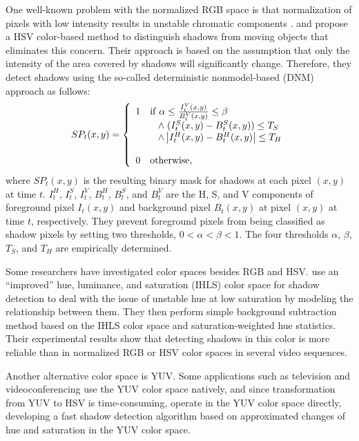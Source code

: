 One well-known problem with the normalized RGB space is that normalization of
pixels with low intensity results in unstable chromatic components
.  and
 propose a HSV color-based method to distinguish
shadows from moving objects that eliminates this concern. Their approach is
based on the assumption that only the intensity of the area covered by shadows
will significantly change. Therefore, they detect shadows using the so-called
deterministic nonmodel-based (DNM) approach as follows:
\[
  SP_t (x,y) = \left\{ 
  \begin{array}{ll}
    1 & {\rm if} \; \alpha \le \frac{{I_t^V (x,y)}}{{B_t^V (x,y)}} \le \beta\\ 
    & \;\;\; \wedge \; (I_t^S (x,y) - B_t^S (x,y)) \le T_S  \\ 
    & \;\;\; \wedge \left| {I_t^H (x,y) - B_t^H (x,y)} \right| \le T_H\\ \\
    0 & {\rm otherwise}, \\ 
  \end{array} \right.
\]
where $SP_t(x,y)$ is the resulting binary mask for shadows at each
pixel $(x,y)$ at time $t$.  $I_t^H$, $I_t^S$, $I_t^V$, $B_t^H$,
$B_t^S$, and $B_t^V$ are the H, S, and V components of foreground
pixel $I_t(x,y)$ and background pixel $B_t(x, y)$ at pixel $(x,y)$ at
time $t$, respectively.  They prevent foreground pixels from being
classified as shadow pixels by setting two thresholds, $0 < \alpha <
\beta < 1$.  The four thresholds $\alpha$, $\beta$, $T_S$, and $T_H$
are empirically determined.

Some researchers have investigated color spaces besides RGB and
HSV.  use an ``improved'' hue, luminance, and
saturation (IHLS) color space for shadow detection to deal with the
issue of unstable hue at low saturation by modeling the relationship
between them. They then perform simple background subtraction method
based on the IHLS color space and saturation-weighted hue statistics.
Their experimental results show that detecting shadows in this color
is more reliable than in normalized RGB or HSV color spaces in several
video sequences.

Another alternative color space is YUV.  Some applications such as
television and videoconferencing use the YUV color space natively, and
since transformation from YUV to HSV is
time-consuming,  operate in the YUV color
space directly, developing a fast shadow detection algorithm based on
approximated changes of hue and saturation in the YUV color space.


